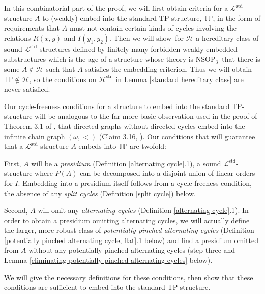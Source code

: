 \documentclass{amsart}
\theoremstyle{definition}
\theoremstyle{remark}
\numberwithin{equation}{section}
\begin{document}
In this combinatorial part of the proof, we will first obtain criteria for a $\mathcal{L}^{\mathrm{std}}$-structure $A$ to (weakly) embed into the standard $\mathrm{TP}$-structure, $\mathbb{TP}$, in the form of requirements that $A$ must not contain certain kinds of cycles involving the relations $R(x, y)$ and $I(y_{1}, y_{2})$. Then we will show--for $\mathcal{H}$ a hereditary class of sound $\mathcal{L}^{\mathrm{std}}$-structures defined by finitely many forbidden weakly embedded substructures which is the age of a structure whose theory is $\mathrm{NSOP}_{3}$--that there is some $A \notin \mathcal{H}$ such that $A$ satisfies the embedding criterion. Thus we will obtain $\mathbb{TP} \notin \mathcal{H}$, so the conditions on $\mathcal{H}^{\mathrm{std}}$ in Lemma \ref{standard hereditary class} are never satisfied.

Our cycle-freeness conditions for a structure to embed into the standard  $\mathrm{TP}$-structure will be analogous to the far more basic observation used in the proof of Theorem 3.1 of \cite{ApproxOrder}, that directed graphs without directed cycles embed into the infinite chain graph $(\omega, <)$ (Claim 3.16, \cite{ApproxOrder}).  Our conditions that will guarantee that a $\mathcal{L}^{\mathrm{std}}$-structure $A$ embeds into $\mathbb{TP}$ are twofold:

First, $A$ will be a \textit{presidium} (Definition \ref{alternating cycle}.1), a sound $\mathcal{L}^{\mathrm{std}}$-structure where $P(A)$ can be decomposed into a disjoint union of linear orders for $I$. Embedding into a presidium itself follows from a cycle-freeness condition, the absence of any \textit{split cycles} (Definition \ref{split cycle}) below.

Second, $A$ will omit any \textit{alternating cycles} (Definition \ref{alternating cycle}.1). In order to obtain a presidium omitting alternating cycles, we will actually define the larger, more robust class of \textit{potentially pinched alternating cycles} (Definition \ref{potentially pinched alternating cycle, flat}.1 below) and find a presidium omitted from $A$ without any potentially pinched alternating cycles (step three and Lemma \ref{eliminating potentially pinched alternating cycles} below).


We will give the necessary definitions for these conditions, then show that these conditions are sufficient to embed into the standard $\mathrm{TP}$-structure.
\end{document}
